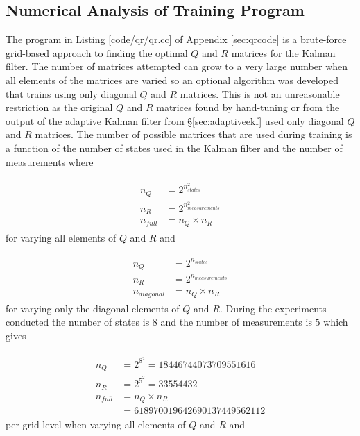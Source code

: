 
\subsection{Numerical Analysis of Training Program}
\label{sec:trainingNumericalAnalysis}
The program in Listing \ref{code/qr/qr.cc} of Appendix \ref{sec:qrcode} is a brute-force grid-based approach to finding the optimal $Q$ and $R$ matrices for the Kalman filter. The number of matrices attempted can grow to a very large number when all elements of the matrices are varied so an optional algorithm was developed that trains using only diagonal $Q$ and $R$ matrices. This is not an unreasonable restriction as the original $Q$ and $R$ matrices found by hand-tuning or from the output of the adaptive Kalman filter from \S\ref{sec:adaptiveekf} used only diagonal $Q$ and $R$ matrices. The number of possible matrices that are used during training is a function of the number of states used in the Kalman filter and the number of measurements where

\begin{align}
\label{eq:trainingFullMatrices}
\begin{split}
n_Q &= 2^{n_{states}^2} \\
n_R &= 2^{n_{measurements}^2} \\
n_{full} &= n_Q \times n_R
\end{split}
\end{align}
for varying all elements of $Q$ and $R$ and

\begin{align}
\label{eq:trainingDiagonalMatrices}
\begin{split}
n_Q &= 2^{n_{states}} \\
n_R &= 2^{n_{measurements}} \\
n_{diagonal} &= n_Q \times n_R
\end{split}
\end{align}
for varying only the diagonal elements of $Q$ and $R$. During the experiments conducted the number of states is $8$ and the number of measurements is $5$ which gives

\begin{align*}
\begin{split}
n_Q &= 2^{8^2} = 18446744073709551616 \\
n_R &= 2^{5^2} = 33554432 \\
n_{full} &= n_Q \times n_R \\
&= 618970019642690137449562112
\end{split}
\end{align*}
per grid level when varying all elements of $Q$ and $R$ and

